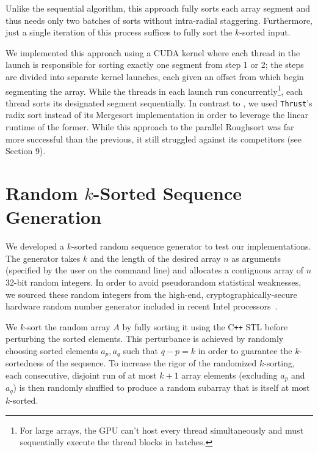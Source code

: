 \documentclass[letterpaper, 12pt]{article}
\let\supercite\cite
\renewcommand{\cite}[1]{\textnormal{~\supercite{#1}}}
\begin{document}
Unlike the sequential algorithm, this approach fully sorts each array segment and thus needs only two batches of
  sorts without intra-radial staggering.
Furthermore, just a single iteration of this process suffices to fully sort the $k$-sorted input.

We implemented this approach using a CUDA kernel where each thread in the launch is responsible for sorting exactly one segment
  from step 1 or 2; the steps are divided into separate kernel launches, each given an offset from which begin segmenting the
  array.
While the threads in each launch run concurrently\footnote{For large arrays, the GPU can't host every thread simultaneously and
  must sequentially execute the thread blocks in batches.}, each thread sorts its designated segment sequentially.
In contrast to \supercite{altman90}, we used \texttt{Thrust}'s radix sort instead of its Mergesort implementation in order to leverage
  the linear runtime of the former.
While this approach to the parallel Roughsort was far more successful than the previous, it still struggled against
  its competitors (see Section 9).

\section{Random $k$-Sorted Sequence Generation}
We developed a $k$-sorted random sequence generator to test our implementations.
The generator takes $k$ and the length of the desired array $n$ as arguments (specified by the user on the command line) and
  allocates a contiguous array of $n$ 32-bit random integers.
In order to avoid pseudorandom statistical weaknesses, we sourced these random integers from the high-end,
   cryptographically-secure hardware random number generator included in recent Intel processors\cite{intel12}.

We $k$-sort the random array $A$ by fully sorting it using the C\texttt{++} STL before perturbing the sorted elements.
This perturbance is achieved by randomly choosing sorted elements $a_p, a_q$ such that $q - p = k$ in order to guarantee the
  $k$-sortedness of the sequence.
To increase the rigor of the randomized $k$-sorting, each consecutive, disjoint run of at most $k + 1$ array elements
  (excluding $a_p$ and $a_q$) is then randomly shuffled to produce a random subarray that is itself at most $k$-sorted.
\end{document}
